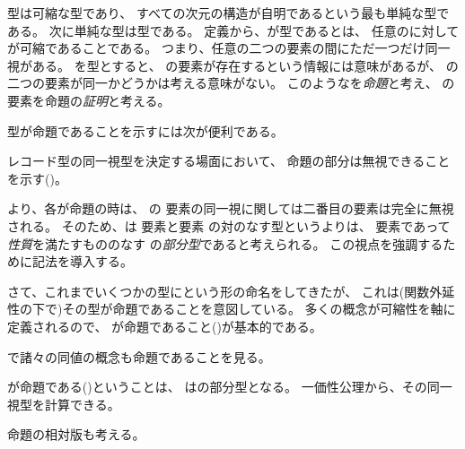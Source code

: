 \documentclass[index]{subfiles}
\begin{document}

\myInlineMath{\myTLMinusTwo}型は可縮な型であり、
すべての次元の構造が自明であるという最も単純な型である。
次に単純な型は\myInlineMath{\myTLMinusOne}型である。
定義から、が\myInlineMath{\myTLMinusOne}型であるとは、
任意のに対して
が可縮であることである。
つまり、任意の二つの要素の間にただ一つだけ同一視がある。
を\myInlineMath{\myTLMinusOne}型とすると、
の要素が存在するという情報には意味があるが、
の二つの要素が同一かどうかは考える意味がない。
このようなを\emph{命題}と考え、
の要素を命題の\emph{証明}と考える。




型が命題であることを示すには次が便利である。



レコード型の同一視型を決定する場面において、
命題の部分は無視できることを示す()。




より、各が命題の時は、
の
要素の同一視に関しては二番目の要素は完全に無視される。
そのため、は
要素と要素
の対のなす型というよりは、
要素であって
\emph{性質}を満たすもののなす
の\emph{部分型}であると考えられる。
この視点を強調するために記法を導入する。



さて、これまでいくつかの型にという形の命名をしてきたが、
これは(関数外延性の下で)その型が命題であることを意図している。
多くの概念が可縮性を軸に定義されるので、
が命題であること()が基本的である。





で諸々の同値の概念も命題であることを見る。

が命題である()ということは、
はの部分型となる。
一価性公理から、その同一視型を計算できる。



命題の相対版も考える。




\begin{mySubsections}
  
\end{mySubsections}
\end{document}
